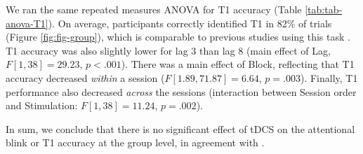 \documentclass[11pt,english,]{memoir}
\begin{document}
We ran the same repeated measures ANOVA for T1 accuracy (Table \ref{tab:tab-anova-T1}). On average, participants correctly identified T1 in 82\% of trials (Figure \ref{fig:fig-group}), which is comparable to previous studies using this task \autocites[86\% in][]{London2015}[in 82\% in][]{Slagter2013}. T1 accuracy was also slightly lower for lag 3 than lag 8 (main effect of Lag, \(F[1, 38] = 29.23\), \(p < .001\)). There was a main effect of Block, reflecting that T1 accuracy decreased \emph{within} a session (\(F[1.89, 71.87] = 6.64\), \(p = .003\)). Finally, T1 performance also decreased \emph{across} the sessions (interaction between Session order and Stimulation: \(F[1, 38] = 11.24\), \(p = .002\)).

In sum, we conclude that there is no significant effect of tDCS on the attentional blink or T1 accuracy at the group level, in agreement with \textcite{London2015}.

\begingroup
\setlength{\LTleft}{-20cm plus -1fill}
\setlength{\LTright}{\LTleft}
\end{document}
